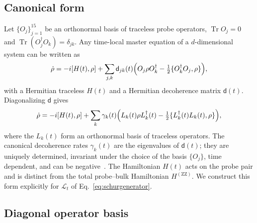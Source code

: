 \documentclass[11pt,a4paper]{article}
\newcommand{\Tr}{\operatorname{Tr}}
\newcommand{\ZZ}{\mathrm{ZZ}}
\newcommand{\dmat}{\mathsf d}
\begin{document}
\subsection{Canonical form}

Let $\{O_j\}_{j=1}^{15}$ be an orthonormal basis of traceless probe
operators, $\Tr O_j=0$ and $\Tr(O_j^\dagger O_k)=\delta_{jk}$. Any
time-local master equation of a $d$-dimensional system can be written
as~\cite{Hall2014}
\begin{equation}
 \dot\rho=-i[H(t),\rho]+\sum_{j,k}\dmat_{jk}(t)
 \Bigl(O_j\rho O_k^\dagger-\tfrac12\{O_k^\dagger O_j,\rho\}\Bigr),
 \label{eq:canonicalgeneral}
\end{equation}
with a Hermitian traceless $H(t)$ and a Hermitian decoherence matrix
$\dmat(t)$. Diagonalizing $\dmat$ gives
\begin{equation}
 \dot\rho=-i[H(t),\rho]+\sum_{k}\gamma_k(t)
 \Bigl(L_k(t)\rho L_k^\dagger(t)
 -\tfrac12\{L_k^\dagger(t)L_k(t),\rho\}\Bigr),
 \label{eq:canonicalform}
\end{equation}
where the $L_k(t)$ form an orthonormal basis of traceless operators.
The canonical decoherence rates $\gamma_k(t)$ are the eigenvalues of
$\dmat(t)$; they are uniquely determined, invariant under the choice
of the basis $\{O_j\}$, time dependent, and can be
negative~\cite{Hall2014}. The Hamiltonian $H(t)$ acts on the probe pair
and is distinct from the total probe--bulk Hamiltonian $H^{(\ZZ)}$. We
construct this form explicitly for $\mathcal L_t$ of
Eq.~\eqref{eq:schurgenerator}.

\subsection{Diagonal operator basis}
\label{sec:diagonalsubspace}
\end{document}
